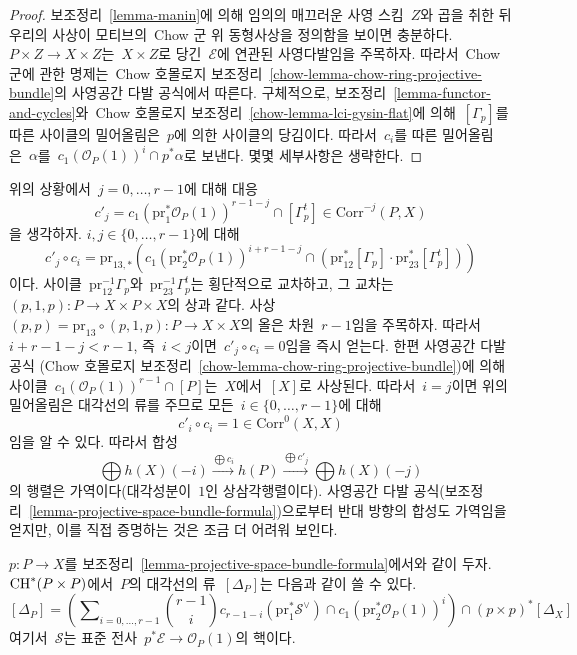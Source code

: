 \begin{proof}
보조정리\  \ref{lemma-manin}에 의해 임의의 매끄러운 사영 스킴\  $Z$와
곱을 취한 뒤 우리의 사상이 모티브의\  Chow 군 위 동형사상을 정의함을
보이면 충분하다. $P \times Z \to X \times Z$는\ 
$X \times Z$로 당긴\  $\mathcal{E}$에 연관된 사영다발임을 주목하자.
따라서\  Chow 군에 관한 명제는\  Chow 호몰로지 보조정리\ 
\ref{chow-lemma-chow-ring-projective-bundle}의 사영공간 다발 공식에서
따른다. 구체적으로, 보조정리\  \ref{lemma-functor-and-cycles}와\ 
Chow 호몰로지 보조정리\  \ref{chow-lemma-lci-gysin-flat}에 의해\ 
$[\Gamma_p]$를 따른 사이클의 밀어올림은\  $p$에 의한 사이클의 당김이다.
따라서\  $c_i$를 따른 밀어올림은\  $\alpha$를\ 
$c_1(\mathcal{O}_P(1))^i \cap p^*\alpha$로 보낸다.
몇몇 세부사항은 생략한다.
\end{proof}

\noindent
위의 상황에서\  $j = 0, \ldots, r - 1$에 대해 대응
$$
c'_j = c_1(\text{pr}_1^*\mathcal{O}_P(1))^{r - 1 - j} \cap [\Gamma_p^t] \in
\text{Corr}^{-j}(P, X)
$$
을 생각하자. $i, j \in \{0, \ldots, r - 1\}$에 대해
$$
c'_j \circ c_i =
\text{pr}_{13, *}\left(
c_1(\text{pr}_2^*\mathcal{O}_P(1))^{i + r - 1 - j} \cap
(\text{pr}_{12}^*[\Gamma_p] \cdot \text{pr}_{23}^*[\Gamma_p^t])
\right)
$$
이다. 사이클\  $\text{pr}_{12}^{-1}\Gamma_p$와\ 
$\text{pr}_{23}^{-1}\Gamma_p^t$는 횡단적으로 교차하고, 그 교차는\ 
$(p, 1, p) : P \to X \times P \times X$의 상과 같다. 사상\ 
$(p, p) = \text{pr}_{13} \circ (p, 1, p) : P \to X \times X$의
올은 차원\  $r - 1$임을 주목하자. 따라서\ 
$i + r - 1 - j < r - 1$, 즉\  $i < j$이면\ 
$c'_j \circ c_i = 0$임을 즉시 얻는다. 한편 사영공간 다발 공식
(Chow 호몰로지 보조정리\ 
\ref{chow-lemma-chow-ring-projective-bundle})에 의해 사이클\ 
$c_1(\mathcal{O}_P(1))^{r - 1} \cap [P]$는\  $X$에서\  $[X]$로
사상된다. 따라서\  $i = j$이면 위의 밀어올림은 대각선의 류를 주므로
모든\  $i \in \{0, \ldots, r - 1\}$에 대해
$$
c'_i \circ c_i = 1 \in \text{Corr}^0(X, X)
$$
임을 알 수 있다. 따라서 합성
$$
\bigoplus h(X)(-i)
\xrightarrow{\bigoplus c_i}
h(P)
\xrightarrow{\bigoplus c'_j}
\bigoplus h(X)(-j)
$$
의 행렬은 가역이다(대각성분이\  $1$인 상삼각행렬이다).
사영공간 다발 공식(보조정리\ 
\ref{lemma-projective-space-bundle-formula})으로부터 반대 방향의
합성도 가역임을 얻지만, 이를 직접 증명하는 것은 조금 더 어려워 보인다.

\begin{lemma}
\label{lemma-diagonal-projective-bundle}
$p : P \to X$를 보조정리\ 
\ref{lemma-projective-space-bundle-formula}에서와 같이 두자.
$\mathop{\mathrm{CH}}\nolimits^*(P \times P)$에서\  $P$의 대각선의 류\  $[\Delta_P]$는
다음과 같이 쓸 수 있다.
$$
[\Delta_P] =
\left(\sum\nolimits_{i = 0, \ldots, r - 1}
{r - 1 \choose i} c_{r - 1 - i}(\text{pr}_1^*\mathcal{S}^\vee) \cap
c_1(\text{pr}_2^*\mathcal{O}_P(1))^i\right)
\cap
(p \times p)^*[\Delta_X]
$$
여기서\  $\mathcal{S}$는 표준 전사\ 
$p^*\mathcal{E} \to \mathcal{O}_P(1)$의 핵이다.
\end{lemma}

